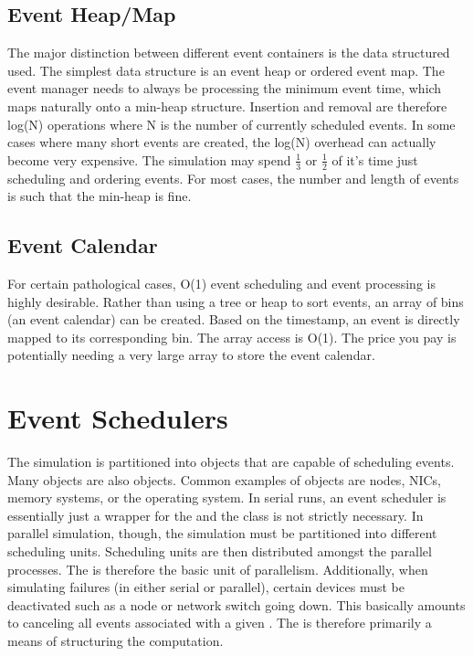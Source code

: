 \subsection{Event Heap/Map}
The major distinction between different event containers is the data structured used.
The simplest data structure is an event heap or ordered event map.
The event manager needs to always be processing the minimum event time, which maps naturally onto a min-heap structure.
Insertion and removal are therefore log(N) operations where N is the number of currently scheduled events.
In some cases where many short events are created, the log(N) overhead can actually become very expensive.
The simulation may spend $\tfrac{1}{3}$ or $\tfrac{1}{2}$ of it's time just scheduling and ordering events.
For most cases, the number and length of events is such that the min-heap is fine.

\subsection{Event Calendar}
For certain pathological cases, O(1) event scheduling and event processing is highly desirable.
Rather than using a tree or heap to sort events, an array of bins (an event calendar) can be created.
Based on the timestamp, an event is directly mapped to its corresponding bin.
The array access is O(1).
The price you pay is potentially needing a very large array to store the event calendar.

\section{Event Schedulers}
The simulation is partitioned into objects that are capable of scheduling events.
Many \evscheduler objects are also \evhandler objects.
Common examples of \evscheduler objects are nodes, NICs, memory systems, or the operating system.
In serial runs, an event scheduler is essentially just a wrapper for the \evmgr and the class is not strictly necessary.
In parallel simulation, though, the simulation must be partitioned into different scheduling units.
Scheduling units are then distributed amongst the parallel processes.
The \evscheduler is therefore the basic unit of parallelism.
Additionally, when simulating failures (in either serial or parallel), certain devices must be deactivated such as a node or network switch going down.
This basically amounts to canceling all events associated with a given \evscheduler.
The \evscheduler is therefore primarily a means of structuring the computation.



